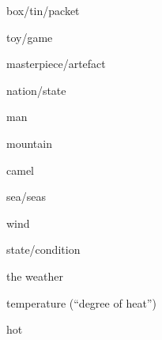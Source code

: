

\begin{flashcard}{\LARGE box/tin/packet}
\LARGE {}
\end{flashcard}
\begin{flashcard}{\LARGE toy/game}
\LARGE {}
\end{flashcard}
\begin{flashcard}{\LARGE masterpiece/artefact}
\LARGE {}
\end{flashcard}
\begin{flashcard}{\LARGE nation/state}
\LARGE {}
\end{flashcard}
\begin{flashcard}{\LARGE man}
\LARGE {}
\end{flashcard}
\begin{flashcard}{\LARGE mountain}
\LARGE {}
\end{flashcard}
\begin{flashcard}{\LARGE camel}
\LARGE {}
\end{flashcard}
\begin{flashcard}{\LARGE sea/seas}
\LARGE {}
\end{flashcard}
\begin{flashcard}{\LARGE wind}
\LARGE {}
\end{flashcard}
\begin{flashcard}{\LARGE state/condition}
\LARGE {}
\end{flashcard}
\begin{flashcard}{\LARGE the weather}
\LARGE {}
\end{flashcard}
\begin{flashcard}{\LARGE temperature (``degree of heat'')}
\LARGE {}
\end{flashcard}
\begin{flashcard}{\LARGE hot}
\LARGE {}
\end{flashcard}
